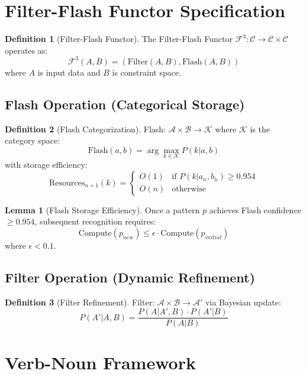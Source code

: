 \documentclass[11pt]{article}
\theoremstyle{definition}
\newtheorem{definition}{Definition}
\newtheorem{lemma}{Lemma}
\begin{document}
\section{Filter-Flash Functor Specification}

\begin{definition}[Filter-Flash Functor]
The Filter-Flash Functor $\mathcal{F}^3: \mathcal{C} \to \mathcal{C} \times \mathcal{C}$ operates as:
\[
\mathcal{F}^3(A, B) = (\text{Filter}(A, B), \text{Flash}(A, B))
\]
where $A$ is input data and $B$ is constraint space.
\end{definition}

\subsection{Flash Operation (Categorical Storage)}

\begin{definition}[Flash Categorization]
Flash: $\mathcal{A} \times \mathcal{B} \to \mathcal{K}$ where $\mathcal{K}$ is the category space:
\[
\text{Flash}(a, b) = \arg\max_{k \in \mathcal{K}} P(k | a, b)
\]
with storage efficiency:
\[
\text{Resources}_{n+1}(k) = \begin{cases}
O(1) & \text{if } P(k | a_n, b_n) \geq 0.954 \\
O(n) & \text{otherwise}
\end{cases}
\]
\end{definition}

\begin{lemma}[Flash Storage Efficiency]
Once a pattern $p$ achieves Flash confidence $\geq 0.954$, subsequent recognition requires:
\[
\text{Compute}(p_{new}) \leq \epsilon \cdot \text{Compute}(p_{initial})
\]
where $\epsilon < 0.1$.
\end{lemma}

\subsection{Filter Operation (Dynamic Refinement)}

\begin{definition}[Filter Refinement]
Filter: $\mathcal{A} \times \mathcal{B} \to \mathcal{A}'$ via Bayesian update:
\[
P(A' | A, B) = \frac{P(A | A', B) \cdot P(A' | B)}{P(A | B)}
\]
\end{definition}

\section{Verb-Noun Framework}
\end{document}
